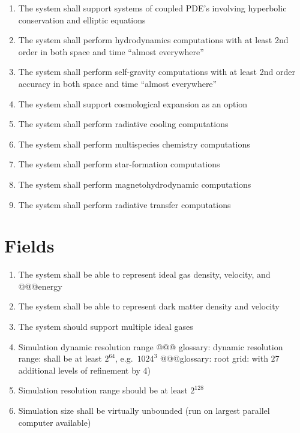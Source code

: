 \documentclass{book}
\begin{document}
\begin{enumerate}
  \item The system shall support systems of coupled PDE's involving hyperbolic conservation and elliptic equations

  \item The system shall perform hydrodynamics computations with at least
  2nd order in both space and time ``almost everywhere''

  \item The system shall perform self-gravity computations with at least
  2nd order accuracy in both space and time ``almost everywhere''

  \item The system shall support cosmological expansion as an option

  \item The system shall perform radiative cooling computations

  \item The system shall perform multispecies chemistry computations

  \item The system shall perform star-formation computations

  \item The system shall perform magnetohydrodynamic computations

  \item The system shall perform radiative transfer computations
\end{enumerate}

\section{Fields}


\begin{enumerate}
  \item The system shall be able to represent ideal gas density, velocity,
  and @@@energy

  \item The system shall be able to represent dark matter density and
  velocity

  \item The system should support multiple ideal gases

  \item Simulation dynamic resolution range @@@ glossary: dynamic
  resolution range: shall be at least $2^64$, e.g.~$1024^3$
  @@@glossary: root grid: with $27$ additional levels of refinement by
  $4$)

  \item Simulation resolution range should be at least $2^128$

  \item Simulation size shall be virtually unbounded (run on largest
  parallel computer available)
\end{enumerate}
\end{document}

